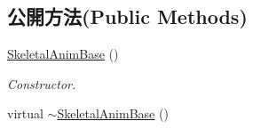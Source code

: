 \subsection*{公開方法(Public Methods)}
\begin{DoxyCompactItemize}
\item 
\hyperlink{class_i_dream_sky_1_1_skeletal_anim_base_a41b847c7e94a02cf2184ed55ec294d72}{Skeletal\+Anim\+Base} ()\hypertarget{class_i_dream_sky_1_1_skeletal_anim_base_a41b847c7e94a02cf2184ed55ec294d72}{}\label{class_i_dream_sky_1_1_skeletal_anim_base_a41b847c7e94a02cf2184ed55ec294d72}

\begin{DoxyCompactList}\small\item\em Constructor. \end{DoxyCompactList}\item 
virtual \hyperlink{class_i_dream_sky_1_1_skeletal_anim_base_a26c385908716fbb8faf765c8294933b7}{$\sim$\+Skeletal\+Anim\+Base} ()\hypertarget{class_i_dream_sky_1_1_skeletal_anim_base_a26c385908716fbb8faf765c8294933b7}{}\label{class_i_dream_sky_1_1_skeletal_anim_base_a26c385908716fbb8faf765c8294933b7}


\end{DoxyCompactItemize}

